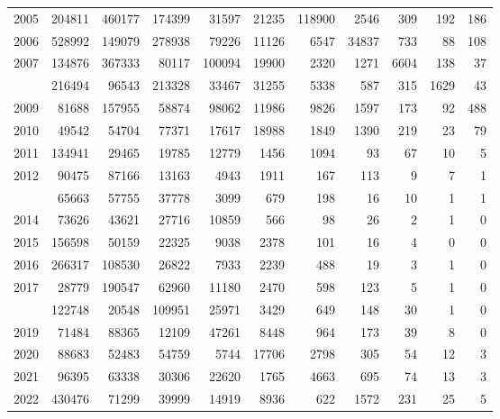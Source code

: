 \documentclass[
]{article}
\begin{document}
\begin{longtable}[t]{lrrrrrrrrrr}
2005 & 204811 & 460177 & 174399 & 31597 & 21235 & 118900 & 2546 & 309 & 192 & 186\\
2006 & 528992 & 149079 & 278938 & 79226 & 11126 & 6547 & 34837 & 733 & 88 & 108\\
2007 & 134876 & 367333 & 80117 & 100094 & 19900 & 2320 & 1271 & 6604 & 138 & 37\\
\addlinespace
2008 & 216494 & 96543 & 213328 & 33467 & 31255 & 5338 & 587 & 315 & 1629 & 43\\
2009 & 81688 & 157955 & 58874 & 98062 & 11986 & 9826 & 1597 & 173 & 92 & 488\\
2010 & 49542 & 54704 & 77371 & 17617 & 18988 & 1849 & 1390 & 219 & 23 & 79\\
2011 & 134941 & 29465 & 19785 & 12779 & 1456 & 1094 & 93 & 67 & 10 & 5\\
2012 & 90475 & 87166 & 13163 & 4943 & 1911 & 167 & 113 & 9 & 7 & 1\\
\addlinespace
2013 & 65663 & 57755 & 37778 & 3099 & 679 & 198 & 16 & 10 & 1 & 1\\
2014 & 73626 & 43621 & 27716 & 10859 & 566 & 98 & 26 & 2 & 1 & 0\\
2015 & 156598 & 50159 & 22325 & 9038 & 2378 & 101 & 16 & 4 & 0 & 0\\
2016 & 266317 & 108530 & 26822 & 7933 & 2239 & 488 & 19 & 3 & 1 & 0\\
2017 & 28779 & 190547 & 62960 & 11180 & 2470 & 598 & 123 & 5 & 1 & 0\\
\addlinespace
2018 & 122748 & 20548 & 109951 & 25971 & 3429 & 649 & 148 & 30 & 1 & 0\\
2019 & 71484 & 88365 & 12109 & 47261 & 8448 & 964 & 173 & 39 & 8 & 0\\
2020 & 88683 & 52483 & 54759 & 5744 & 17706 & 2798 & 305 & 54 & 12 & 3\\
2021 & 96395 & 63338 & 30306 & 22620 & 1765 & 4663 & 695 & 74 & 13 & 3\\
2022 & 430476 & 71299 & 39999 & 14919 & 8936 & 622 & 1572 & 231 & 25 & 5\\*
\end{longtable}
\end{document}
